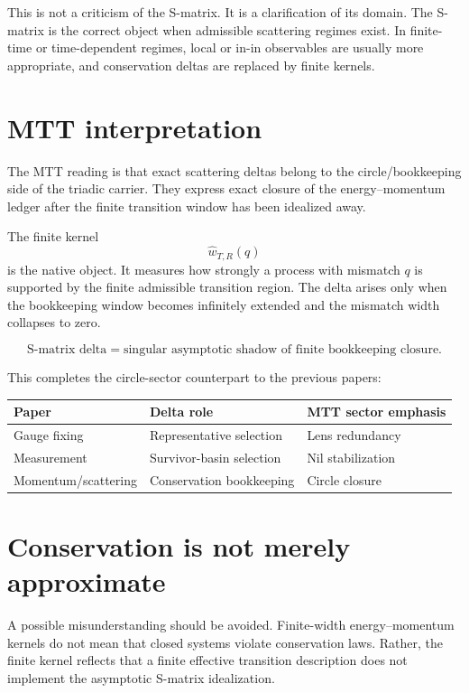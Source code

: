 \documentclass[11pt]{article}
\begin{document}
This is not a criticism of the S-matrix.  It is a clarification of its domain.  The S-matrix is the correct object when admissible scattering regimes exist.  In finite-time or time-dependent regimes, local or in-in observables are usually more appropriate, and conservation deltas are replaced by finite kernels.

\section{MTT interpretation}

The MTT reading is that exact scattering deltas belong to the circle/bookkeeping side of the triadic carrier.  They express exact closure of the energy--momentum ledger after the finite transition window has been idealized away.

The finite kernel
\[
\widehat w_{T,R}(q)
\]
is the native object.  It measures how strongly a process with mismatch \(q\) is supported by the finite admissible transition region.  The delta arises only when the bookkeeping window becomes infinitely extended and the mismatch width collapses to zero.

\[
\boxed{
\text{S-matrix delta}
=
\text{singular asymptotic shadow of finite bookkeeping closure}.
}
\]

This completes the circle-sector counterpart to the previous papers:

\begin{center}
\begin{tabular}{lll}
\hline
Paper & Delta role & MTT sector emphasis \\
\hline
Gauge fixing & Representative selection & Lens redundancy \\
Measurement & Survivor-basin selection & Nil stabilization \\
Momentum/scattering & Conservation bookkeeping & Circle closure \\
\hline
\end{tabular}
\end{center}

\section{Conservation is not merely approximate}

A possible misunderstanding should be avoided.  Finite-width energy--momentum kernels do not mean that closed systems violate conservation laws.  Rather, the finite kernel reflects that a finite effective transition description does not implement the asymptotic S-matrix idealization.
\end{document}
